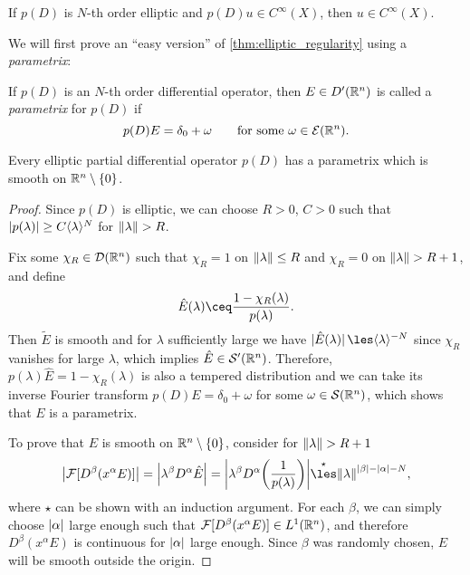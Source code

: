 \begin{corollary}
	If $p(D)$ is $N$-th order elliptic and $p(D)u \in C^\infty(X)$, then $u \in C^\infty(X)$. 
\end{corollary}

We will first prove an ``easy version'' of \cref{thm:elliptic_regularity} using a \emph{parametrix}: 
\begin{definition}
	If $p(D)$ is an $N$-th order differential operator, then $E \in D'(\mathbb R^n)$ is called a \emph{parametrix} for $p(D)$ if
	\[
	p(D)E = \delta_0 + \omega \qquad\text{for some $\omega \in \mathcal E(\mathbb R^n)$}. 
	\]
\end{definition}

\begin{lemma}
	Every elliptic partial differential operator $p(D)$ has a parametrix which is smooth on $\mathbb R^n \setminus \qty{0}$. 
\end{lemma}

\begin{proof}
	Since $p(D)$ is elliptic, we can choose $R > 0$, $C > 0$ such that $\abs{p(\lambda)} \geq C \langle\lambda\rangle^N$  for $\norm{\lambda} > R$. 
	
	Fix some $\chi_R \in \mathcal D(\mathbb R^n)$ such that $\chi_R = 1$ on $\norm{\lambda} \leq R$ and $\chi_R = 0$ on $\norm{\lambda} > R + 1$, and define
	\[
	\hat E(\lambda) \ceq \frac{1 - \chi_R(\lambda)}{p(\lambda)}. 
	\]
	Then $\tilde E$ is smooth and for $\lambda$ sufficiently large we have $\abs*{\hat E(\lambda)} \les \ang{\lambda}^{-N}$ since $\chi_R$ vanishes for large $\lambda$, which implies $\hat E \in \mathcal S'(\mathbb R^n)$. Therefore, $p(\lambda) \hat E = 1 - \chi_R(\lambda)$ is also a tempered distribution and we can take its inverse Fourier transform $p(D) E = \delta_0 + \omega$ for some $\omega \in \mathcal S(\mathbb R^n)$, which shows that $E$ is a parametrix. 
	
	To prove that $E$ is smooth on $\mathbb R^n \setminus \qty{0}$, consider for $\norm{\lambda} > R + 1$
	\[
	\abs{\FF[D^\beta (x^\alpha E)]} = \abs{\lambda^\beta D^\alpha \hat E} = \abs{\lambda^\beta D^\alpha\qty(\frac1{p(\lambda)})} \overset\star\les \norm{\lambda}^{\abs{\beta} - \abs{\alpha} - N},
	\]
	where $\star$ can be shown with an induction argument. For each $\beta$, we can simply choose $\abs{\alpha}$ large enough such that $\mathcal F[D^\beta (x^\alpha E)] \in L^1(\mathbb R^n)$, and therefore $D^\beta(x^\alpha E)$ is continuous for $\abs{\alpha}$ large enough. Since $\beta$ was randomly chosen, $E$ will be smooth outside the origin. 
\end{proof}

